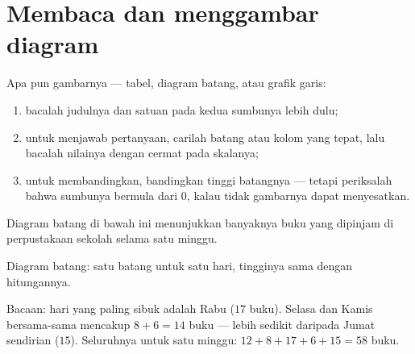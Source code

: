 \section{Membaca dan menggambar diagram}

\begin{method}\label{met:g6:propdata:read}
Apa pun gambarnya --- tabel, diagram batang, atau grafik garis:
\begin{enumerate}
  \item bacalah judulnya dan satuan pada kedua sumbunya lebih dulu;
  \item untuk menjawab pertanyaan, carilah batang atau kolom yang
        tepat, lalu bacalah nilainya dengan cermat pada skalanya;
  \item untuk membandingkan, bandingkan tinggi batangnya --- tetapi
        periksalah bahwa sumbunya bermula dari $0$, kalau tidak
        gambarnya dapat menyesatkan.
\end{enumerate}
\end{method}

\begin{example}\label{ex:g6:propdata:chart}
Diagram batang di bawah ini menunjukkan banyaknya buku yang dipinjam
di perpustakaan sekolah selama satu minggu.

\begin{omfigure}

{\small Diagram batang: satu batang untuk satu hari, tingginya sama dengan hitungannya.}
\end{omfigure}

Bacaan: hari yang paling sibuk adalah Rabu ($17$ buku). Selasa dan
Kamis bersama-sama mencakup $8 + 6 = 14$ buku --- lebih sedikit
daripada Jumat sendirian ($15$). Seluruhnya untuk satu minggu:
$12 + 8 + 17 + 6 + 15 = 58$ buku.
\end{example}

